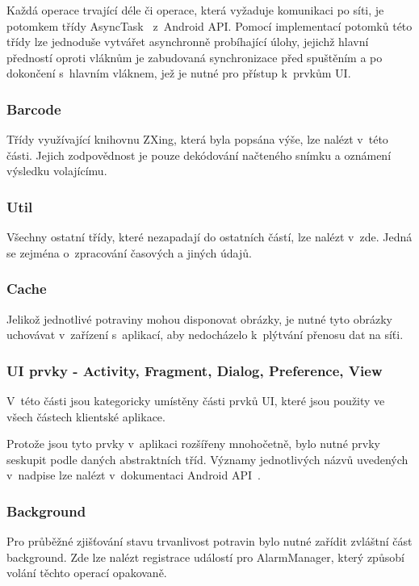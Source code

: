 \documentclass[thesis=B,czech]{FITthesis}[2013/10/20]
\begin{document}
Každá operace trvající déle či operace, která vyžaduje komunikaci po síti, je potomkem třídy AsyncTask~\cite{async_task} z~Android API. Pomocí implementací potomků této třídy lze jednoduše vytvářet asynchronně probíhající úlohy, jejichž hlavní předností oproti vláknům je zabudovaná synchronizace před spuštěním a po dokončení s~hlavním vláknem, jež je nutné pro přístup k~prvkům UI.

\subsubsection{Barcode}

Třídy využívající knihovnu ZXing, která byla popsána výše, lze nalézt v~této části. Jejich zodpovědnost je pouze dekódování načteného snímku a oznámení výsledku volajícímu.

\subsubsection{Util}

Všechny ostatní třídy, které nezapadají do ostatních částí, lze nalézt v~zde. Jedná se zejména o~zpracování časových a jiných údajů.

\subsubsection{Cache}

Jelikož jednotlivé potraviny mohou disponovat obrázky, je nutné tyto obrázky uchovávat v~zařízení s~aplikací, aby nedocházelo k~plýtvání přenosu dat na síťi.

\subsubsection{UI prvky - Activity, Fragment, Dialog, Preference, View}

V~této části jsou kategoricky umístěny části prvků UI, které jsou použity ve všech částech klientské aplikace.

Protože jsou tyto prvky v~aplikaci rozšířeny mnohočetně, bylo nutné prvky seskupit podle daných abstraktních tříd. Významy jednotlivých názvů uvedených v~nadpise lze nalézt v~dokumentaci Android API~\cite{android_api}. 

\subsubsection{Background}

Pro průběžné zjišťování stavu trvanlivost potravin bylo nutné zařídit zvláštní část background. Zde lze nalézt registrace událostí pro AlarmManager\cite{alarm_manager}, který způsobí volání těchto operací opakovaně.
\end{document}
